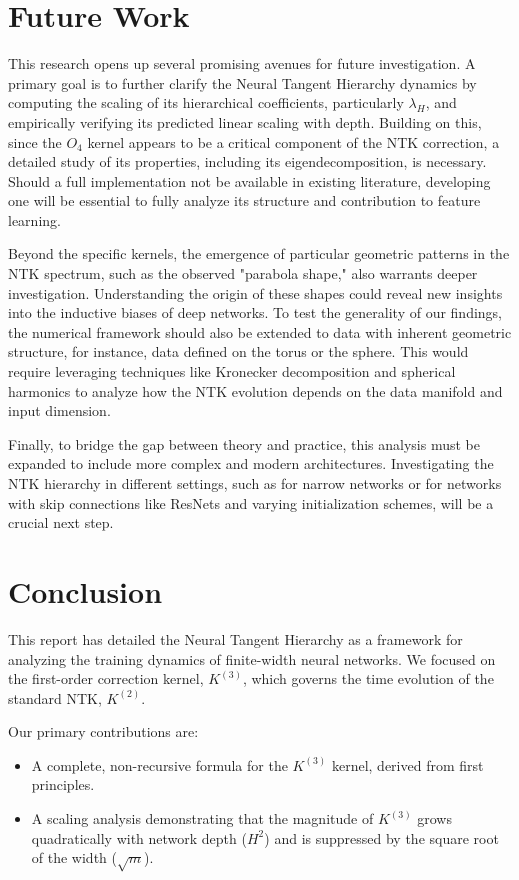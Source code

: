 \documentclass{article}
\begin{document}
\section{Future Work}
This research opens up several promising avenues for future investigation. A primary goal is to further clarify the Neural Tangent Hierarchy dynamics by computing the scaling of its hierarchical coefficients, particularly $\lambda_H$, and empirically verifying its predicted linear scaling with depth. Building on this, since the $O_4$ kernel appears to be a critical component of the NTK correction, a detailed study of its properties, including its eigendecomposition, is necessary. Should a full implementation not be available in existing literature, developing one will be essential to fully analyze its structure and contribution to feature learning.

Beyond the specific kernels, the emergence of particular geometric patterns in the NTK spectrum, such as the observed "parabola shape," also warrants deeper investigation. Understanding the origin of these shapes could reveal new insights into the inductive biases of deep networks. To test the generality of our findings, the numerical framework should also be extended to data with inherent geometric structure, for instance, data defined on the torus or the sphere. This would require leveraging techniques like Kronecker decomposition and spherical harmonics to analyze how the NTK evolution depends on the data manifold and input dimension.

Finally, to bridge the gap between theory and practice, this analysis must be expanded to include more complex and modern architectures. Investigating the NTK hierarchy in different settings, such as for narrow networks or for networks with skip connections like ResNets and varying initialization schemes, will be a crucial next step.

\section{Conclusion}

This report has detailed the Neural Tangent Hierarchy as a framework for analyzing the training dynamics of finite-width neural networks. We focused on the first-order correction kernel, $K^{(3)}$, which governs the time evolution of the standard NTK, $K^{(2)}$.

Our primary contributions are:
\begin{itemize}
    \item A complete, non-recursive formula for the $K^{(3)}$ kernel, derived from first principles.
    \item A scaling analysis demonstrating that the magnitude of $K^{(3)}$ grows quadratically with network depth ($H^2$) and is suppressed by the square root of the width ($\sqrt{m}$).
\end{itemize}
\end{document}
